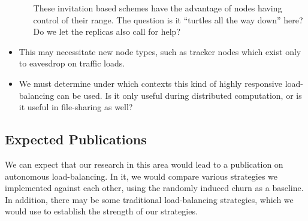 \begin{itemize}
\begin{itemize}
		These invitation based schemes have the advantage of nodes having control of their range. 
		The question is it ``turtles all the way down'' here?
		Do we let the replicas also call for help?
	\end{itemize}
	\item This may necessitate new node types, such as tracker nodes which exist only to eavesdrop on traffic loads.
	\item We must determine under which contexts this kind of highly responsive load-balancing can be used. 
	Is it only useful during distributed computation, or is it useful in file-sharing as well?
	
	
\end{itemize}


\subsection{Expected Publications}
We can expect that our research in this area would lead to a publication on autonomous load-balancing.
In it, we would compare various strategies we implemented against each other, using the randomly induced churn as a baseline.
In addition, there may be some traditional load-balancing strategies, which we would use to establish the strength of our strategies.



